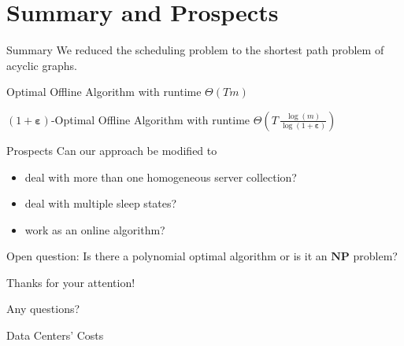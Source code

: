 \documentclass{beamer}
\newcommand{\beps}{\boldsymbol\varepsilon}
\begin{document}
\section{Summary and Prospects}
\begin{frame}{Summary}
We reduced the scheduling problem to the shortest path problem of acyclic graphs.

\pause
\begin{alertbox}
\centering Optimal Offline Algorithm with runtime $\Theta(Tm)$
\end{alertbox}
\pause
\begin{alertbox}
\centering $(1+\beps)$-Optimal Offline Algorithm with runtime $\Theta\left(T\,\frac{\log(m)}{\log(1+\beps)}\right)$
\end{alertbox}
\end{frame}
\begin{frame}{Prospects}
Can our approach be modified to\dotso
\pause
\begin{itemize}[<+->]
	\item deal with more than one homogeneous server collection?
	\item deal with multiple sleep states?
	\item work as an online algorithm?
\end{itemize}
\pause[\thebeamerpauses]
Open question: Is there a polynomial optimal algorithm or is it an $\textbf{NP}$ problem?
\end{frame}
\begin{frame}[standout]
Thanks for your attention!

Any questions?
\end{frame}
\begin{frame}{Data Centers' Costs}

\vspace{0.5\baselineskip}
\end{frame}
\end{document}
